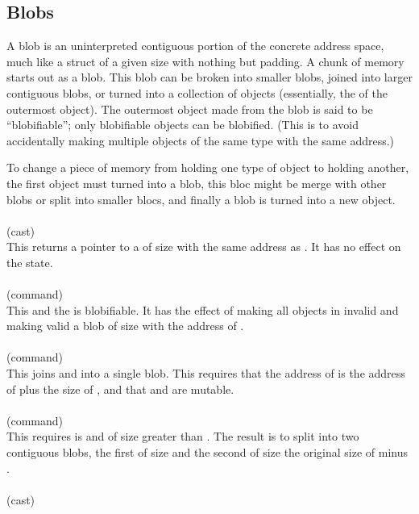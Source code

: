 \documentclass[preprint,nocopyrightspace]{sigplanconf}
\begin{document}
{{{\subsection{Blobs}
A blob is an uninterpreted contiguous portion of the concrete address
space, much like a struct of a given size with nothing but padding. 
A chunk of memory starts out as a blob. This blob can be broken into
smaller blobs, joined into larger contiguous blobs, or turned into a
collection of objects (essentially, the  of the outermost
object). The outermost object made from the blob is said to be
``blobifiable''; only blobifiable objects can be blobified. (This is
to avoid accidentally making multiple objects of the same type with
the same address.) 

To change a piece of memory from holding one type of object to holding
another, the first object must turned into a blob, this bloc might be 
merge with other blobs or split into smaller blocs, and finally a blob
is turned into a new object. 
\\\\
 (cast)\\
This returns a pointer to a  of size  with the same
address as . It has no effect on the state. 
\\\\
 (command)\\
This    and
the \vcc{\object} is blobifiable. It has the effect of making all
objects in  invalid and making valid a blob of
size  with the address of .
\\\\ 
 (command)\\
This joins  and  into a single blob. This requires that
the address of  is the address of  plus the size
of , and that  and  are mutable.
\\\\
 (command)\\
This requires  is \vcc{\mutable} and of size greater
than . The result is to split  into two contiguous
blobs, the first of size  and the second of size the original
size of  minus .
\\\\
 (cast) \\
}}}
\end{document}
